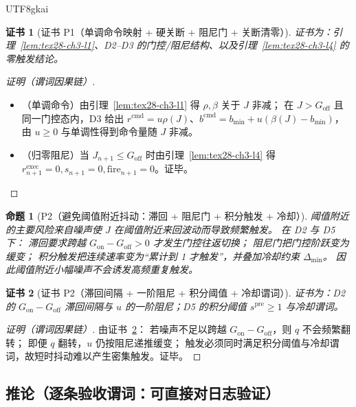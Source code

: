 \documentclass[12pt]{article}
\newtheorem{proposition}{命题}[section]
\newtheorem{Certificate}{证书}[section]
\begin{document}
\begin{CJK*}{UTF8}{gkai}
\begin{Certificate}[证书 P1（单调命令映射 + 硬关断 + 阻尼门 + 关断清零）]
\label{cert:tex28-ch3-p1}
证书为：引理~\ref{lem:tex28-ch3-l1}、D2--D3 的门控/阻尼结构、以及引理~\ref{lem:tex28-ch3-l4} 的零触发结论。
\end{Certificate}

\begin{proof}[证明（谓词因果链）]
\begin{itemize}
  \item（单调命令）由引理~\ref{lem:tex28-ch3-l1} 得 $\rho,\beta$ 关于 $J$ 非减；
  在 $J>G_{\mathrm{off}}$ 且同一门控态内，D3 给出 $r^{\mathrm{cmd}}=u\rho(J)$、$b^{\mathrm{cmd}}=b_{\min}+u(\beta(J)-b_{\min})$，
  由 $u\ge 0$ 与单调性得到命令量随 $J$ 非减。
  \item（归零阻尼）当 $J_{n+1}\le G_{\mathrm{off}}$ 时由引理~\ref{lem:tex28-ch3-l4} 得
  $r^{\mathrm{exec}}_{n+1}=0,s_{n+1}=0,\mathrm{fire}_{n+1}=0$。证毕。
\end{itemize}
\end{proof}

\begin{proposition}[P2（避免阈值附近抖动：滞回 + 阻尼门 + 积分触发 + 冷却）]
\label{prop:tex28-ch3-p2}
阈值附近的主要风险来自噪声使 $J$ 在阈值附近来回波动而导致频繁触发。
在 D2 与 D5 下：
滞回要求跨越 $G_{\mathrm{on}}-G_{\mathrm{off}}>0$ 才发生门控往返切换；
阻尼门把门控阶跃变为缓变；
积分触发把连续速率变为“累计到 1 才触发”，并叠加冷却约束 $\Delta_{\min}$。
因此阈值附近小幅噪声不会诱发高频重复触发。
\end{proposition}

\begin{Certificate}[证书 P2（滞回间隔 + 一阶阻尼 + 积分阈值 + 冷却谓词）]
\label{cert:tex28-ch3-p2}
证书为：D2 的 $G_{\mathrm{on}}-G_{\mathrm{off}}$ 滞回间隔与 $u$ 的一阶阻尼；D5 的积分阈值 $s^{\mathrm{pre}}\ge 1$ 与冷却谓词。
\end{Certificate}

\begin{proof}[证明（谓词因果链）]
由证书~\ref{cert:tex28-ch3-p2}：
若噪声不足以跨越 $G_{\mathrm{on}}-G_{\mathrm{off}}$，则 $q$ 不会频繁翻转；
即便 $q$ 翻转，$u$ 仍按阻尼递推缓变；
触发必须同时满足积分阈值与冷却谓词，故短时抖动难以产生密集触发。证毕。
\end{proof}

\subsection{推论（逐条验收谓词：可直接对日志验证）}
\label{subsec:tex28-ch3-corollaries}


\end{CJK*}
\end{document}
